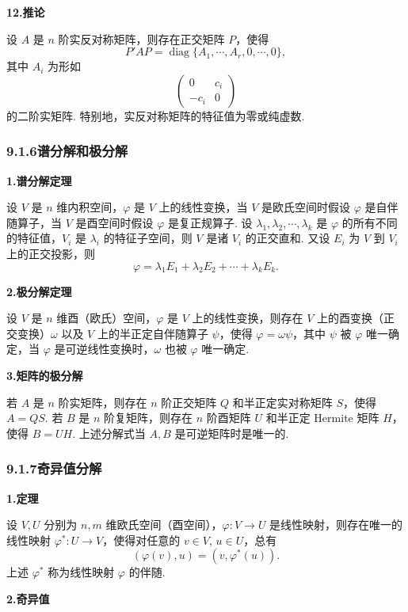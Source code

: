 \documentclass[UTF8,12pt,a4paper,fontset=fandol]{ctexart}
\begin{document}
\noindent\textbf{12.\quad 推论}

设 $A$ 是 $n$ 阶实反对称矩阵，则存在正交矩阵 $P$，使得
\[
P'AP=\operatorname{diag}\{A_1,\cdots,A_r,0,\cdots,0\},
\]
其中 $A_i$ 为形如
\[
\begin{pmatrix}
0 & c_i\\
-c_i & 0
\end{pmatrix}
\]
的二阶实矩阵. 特别地，实反对称矩阵的特征值为零或纯虚数.

\subsubsection*{9.1.6\quad 谱分解和极分解}

\noindent\textbf{1.\quad 谱分解定理}

设 $V$ 是 $n$ 维内积空间，$\varphi$ 是 $V$ 上的线性变换，当 $V$ 是欧氏空间时假设 $\varphi$ 是自伴随算子，当 $V$ 是酉空间时假设 $\varphi$ 是复正规算子. 设 $\lambda_1,\lambda_2,\cdots,\lambda_k$ 是 $\varphi$ 的所有不同的特征值，$V_i$ 是 $\lambda_i$ 的特征子空间，则 $V$ 是诸 $V_i$ 的正交直和. 又设 $E_i$ 为 $V$ 到 $V_i$ 上的正交投影，则
\[
\varphi=\lambda_1E_1+\lambda_2E_2+\cdots+\lambda_kE_k.
\]

\noindent\textbf{2.\quad 极分解定理}

设 $V$ 是 $n$ 维酉（欧氏）空间，$\varphi$ 是 $V$ 上的线性变换，则存在 $V$ 上的酉变换（正交变换）$\omega$ 以及 $V$ 上的半正定自伴随算子 $\psi$，使得 $\varphi=\omega\psi$，其中 $\psi$ 被 $\varphi$ 唯一确定，当 $\varphi$ 是可逆线性变换时，$\omega$ 也被 $\varphi$ 唯一确定.

\noindent\textbf{3.\quad 矩阵的极分解}

若 $A$ 是 $n$ 阶实矩阵，则存在 $n$ 阶正交矩阵 $Q$ 和半正定实对称矩阵 $S$，使得 $A=QS$. 若 $B$ 是 $n$ 阶复矩阵，则存在 $n$ 阶酉矩阵 $U$ 和半正定 Hermite 矩阵 $H$，使得 $B=UH$. 上述分解式当 $A,B$ 是可逆矩阵时是唯一的.

\subsubsection*{9.1.7\quad 奇异值分解}

\noindent\textbf{1.\quad 定理}

设 $V,U$ 分别为 $n,m$ 维欧氏空间（酉空间），$\varphi:V\to U$ 是线性映射，则存在唯一的线性映射 $\varphi^*:U\to V$，使得对任意的 $v\in V$, $u\in U$，总有
\[
(\varphi(v),u)=(v,\varphi^*(u)).
\]
上述 $\varphi^*$ 称为线性映射 $\varphi$ 的伴随.

\noindent\textbf{2.\quad 奇异值}
\end{document}
